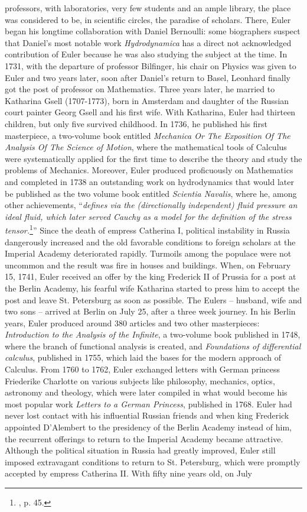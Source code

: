 professors, with laboratories, very few students and an ample library, the place was considered to be, in scientific circles, the paradise of scholars. There, Euler began his longtime collaboration with Daniel Bernoulli: some biographers suspect that Daniel's most notable work \emph{Hydrodynamica} has a direct not acknowledged contribution of Euler because he was also studying the subject at the time. In 1731, with the departure of professor Bilfinger, his chair on Physics was given to Euler and two years later, soon after Daniel's return to Basel, Leonhard finally got the post of professor on Mathematics. Three years later, he married to Katharina Gsell (1707-1773), born in Amsterdam and daughter of the Russian court painter Georg Gsell and his first wife. With Katharina, Euler had thirteen children, but only five survived childhood. In 1736, he published his first masterpiece, a two-volume book entitled \emph{Mechanica Or The Exposition Of The Analysis Of The Science of Motion}, where the mathematical tools of Calculus were systematically applied for the first time to describe the theory and study the problems of Mechanics. Moreover, Euler produced proficuously on Mathematics and completed in 1738 an outstanding work on hydrodynamics that would later be published as the two volume book entitled \emph{Scientia Navalis}, where he, among other achievements, ``\emph{defines via the (directionally independent) fluid pressure an ideal fluid, which later served Cauchy as a model for the definition of the stress tensor.}\footnote{\cite{fellmann_2007_1}, p. 45.}'' Since the death of empress Catherina I, political instability in Russia dangerously increased and the old favorable conditions to foreign scholars at the Imperial Academy deteriorated rapidly. Turmoils among the populace were not uncommon and the result was fire in houses and buildings. When, on February 15, 1741, Euler received an offer by the king Frederick II of Prussia for a post at the Berlin Academy, his fearful wife Katharina started to press him to accept the post and leave St. Petersburg as soon as possible. The Eulers -- husband, wife and two sons --  arrived at Berlin on July 25, after a three week journey. In his Berlin years, Euler produced around 380 articles and two other masterpieces: \emph{Introduction to the Analysis of the Infinite}, a two-volume book published in 1748, where the branch of functional analysis is created, and \emph{Foundations of differential calculus}, published in 1755, which laid the bases for the modern approach of Calculus. From 1760 to 1762, Euler exchanged letters with German princess Friederike Charlotte on various subjects like philosophy, mechanics, optics, astronomy and theology, which were later compiled in what would become his most popular work \emph{Letters to a German Princess}, published in 1768. Euler had never lost contact with his influential Russian friends and when king Frederick appointed D'Alembert to the presidency of the Berlin Academy instead of him, the recurrent offerings to return to the Imperial Academy became attractive. Although the political situation in Russia had greatly improved, Euler still imposed extravagant conditions to return to St. Petersburg, which were promptly accepted by empress Catherina II. With fifty nine years old, on July 